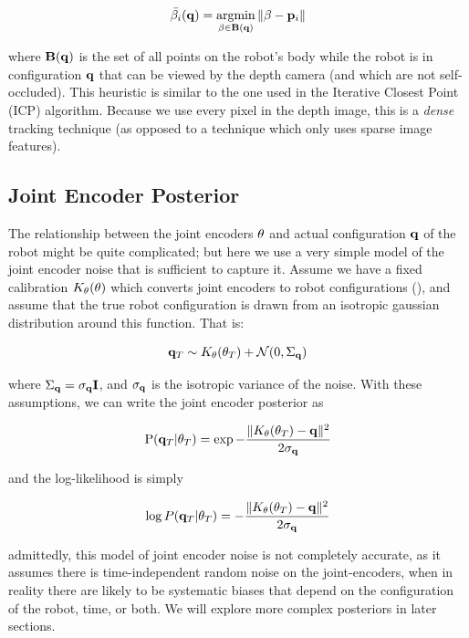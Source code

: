 \begin{equation}
	\bar{\beta_i}(\config) = \argmin_{\beta \in \mathbf{B}(\config)} \|\beta - \pixel_i\|
\end{equation}

\noindent where $\mathbf{B}(\mathbf{q})$ is the set of all points on the robot's body while the robot is in configuration $\mathbf{q}$ that can be viewed by the depth camera (and which are not self-occluded). This heuristic is similar to the one used in the Iterative Closest Point (ICP) algorithm. Because we use every pixel in the depth image, this is a \textit{dense} tracking technique (as opposed to a technique which only uses sparse image features).

\subsection{Joint Encoder Posterior}
The relationship between the joint encoders $\theta$ and actual configuration $\mathbf{q}$ of the robot might be quite complicated; but here we use a very simple model of the joint encoder noise that is sufficient to capture it. Assume we have a fixed calibration $K_\theta(\theta)$ which converts joint encoders to robot configurations (), and assume that the true robot configuration is drawn from an isotropic gaussian distribution around this function. That is:

\begin{equation}
	\mathbf{q}_T \sim K_\theta(\theta_T) + \mathcal{N}(0, \Sigma_{\mathbf{q}})
\end{equation}

\noindent where $\Sigma_{\mathbf{q}} = \sigma_{\mathbf{q}} \mathbf{I}$, and  $\sigma_{\mathbf{q}}$ is the isotropic variance of the noise. With these assumptions, we can write the joint encoder posterior as

\begin{equation}
	\text{P}(\mathbf{q}_T | \theta_T) = \exp{-\frac{\|K_\theta(\theta_T) - \mathbf{q}\|^2}{2 \sigma_{\mathbf{q}}}}
\end{equation} 

\noindent and the log-likelihood is simply

\begin{equation}
	\log P(\mathbf{q}_T | \theta_T) = -\frac{\|K_\theta(\theta_T) - \mathbf{q}\|^2}{2 \sigma_{\mathbf{q}}}
\end{equation}

\noindent admittedly, this model of joint encoder noise is not completely accurate, as it assumes there is time-independent random noise on the joint-encoders, when in reality there are likely to be systematic biases that depend on the configuration of the robot, time, or both. We will explore more complex posteriors in later sections.

